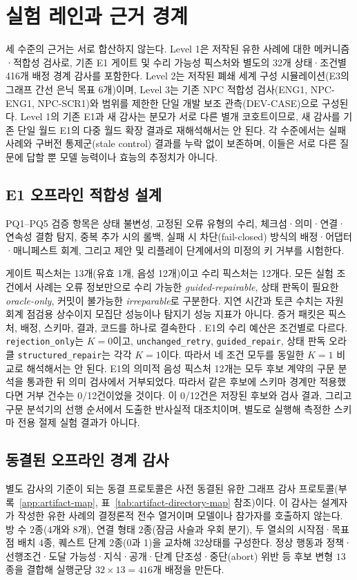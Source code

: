 \documentclass[journal]{IEEEtran}
\begin{document}
\section{실험 레인과 근거 경계}\label{sec:lanes}

세 수준의 근거는 서로 합산하지 않는다. Level 1은 저작된 유한 사례에 대한 메커니즘·적합성 검사로, 기존 E1 게이트 및 수리 가능성 픽스처와 별도의 32개 상태·조건별 416개 배정 경계 감사를 포함한다. Level 2는 저작된 폐쇄 세계 구성 시뮬레이션(E3의 그래프 간선 은닉 목표 6개)이며, Level 3는 기존 NPC 적합성 검사(ENG1, NPC-ENG1, NPC-SCR1)와 범위를 제한한 단일 개발 보조 관측(DEV-CASE)으로 구성된다. Level 1의 기존 E1과 새 감사는 분모가 서로 다른 별개 코호트이므로, 새 감사를 기존 단일 월드 E1의 다중 월드 확장 결과로 재해석해서는 안 된다. 각 수준에서는 실패 사례와 구버전 통제군(stale control) 결과를 누락 없이 보존하며, 이들은 서로 다른 질문에 답할 뿐 모델 능력이나 효능의 추정치가 아니다.
\subsection{\textbf{E1} 오프라인 적합성 설계}
PQ1--PQ5 검증 항목은 상태 불변성, 고정된 오류 유형의 수리, 체크섬·의미·연결·연속성 결함 탐지, 중복 추가 시의 롤백, 실패 시 차단(fail-closed) 방식의 배정·어댑터·매니페스트 회계, 그리고 제안 및 리플레이 단계에서의 미정의 키 거부를 시험한다.

게이트 픽스처는 13개(유효 1개, 음성 12개)이고 수리 픽스처는 12개다. 모든 실험 조건에서 사례는 오류 정보만으로 수리 가능한 \emph{guided-repairable}, 상태 판독이 필요한 \emph{oracle-only}, 커밋이 불가능한 \emph{irreparable}로 구분한다. 지연 시간과 토큰 수치는 자원 회계 점검용 상수이지 모집단 성능이나 탐지기 성능 지표가 아니다. 증거 패킷은 픽스처, 배정, 스키마, 결과, 코드를 하나로 결속한다 \cite{S33_pineau2021reproducibility,S34_henderson2020energy}.
E1의 수리 예산은 조건별로 다르다. \texttt{rejection\_only}는 $K=0$이고, \texttt{unchanged\_retry}, \texttt{guided\_repair}, 상태 판독 오라클 \texttt{structured\_repair}는 각각 $K=1$이다. 따라서 네 조건 모두를 동일한 $K=1$ 비교로 해석해서는 안 된다.
E1의 의미적 음성 픽스처 12개는 모두 후보 계약의 구문 분석을 통과한 뒤 의미 검사에서 거부되었다. 따라서 같은 후보에 스키마 경계만 적용했다면 거부 건수는 0/12건이었을 것이다. 이 0/12건은 저장된 후보와 검사 결과, 그리고 구문 분석기의 선행 순서에서 도출한 반사실적 대조치이며, 별도로 실행해 측정한 스키마 전용 절제 실험 결과가 아니다.

\subsection{동결된 오프라인 경계 감사}\label{sec:review-boundary-audit}
별도 감사의 기준이 되는 동결 프로토콜은 사전 동결된 유한 그래프 감사 프로토콜(부록~\ref{app:artifact-map}, 표~\ref{tab:artifact-directory-map} 참조)이다. 이 감사는 설계자가 작성한 유한 사례의 결정론적 전수 열거이며 모델이나 참가자를 호출하지 않는다. 방 수 $2$종(4개와 8개), 연결 형태 $2$종(잠금 사슬과 우회 분기), 두 열쇠의 시작점·목표점 배치 $4$종, 퀘스트 단계 $2$종(0과 1)을 교차해 $32$상태를 구성한다. 정상 행동과 정책·선행조건·도달 가능성·지식·공개·단계 단조성·중단(abort) 위반 등 후보 변형 $13$종을 결합해 실행군당 $32\times 13=416$개 배정을 만든다.
\end{document}
